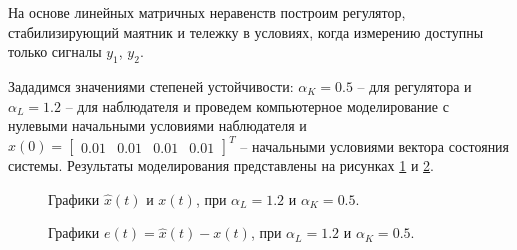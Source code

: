 На основе линейных матричных неравенств построим регулятор, стабилизирующий маятник и тележку в условиях, когда измерению доступны только сигналы $y_1$, $y_2$.

Зададимся значениями степеней устойчивости: $\alpha_K = 0.5$ -- для регулятора и $\alpha_L=1.2$ -- для наблюдателя и проведем компьютерное моделирование с нулевыми начальными условиями наблюдателя и $x(0) = \begin{bmatrix}
    0.01 & 0.01 & 0.01 & 0.01
\end{bmatrix}^T$ -- начальными условиями вектора состояния системы. Результаты моделирования представлены на рисунках \ref{4_6_1.20.5x} и \ref{4_6_1.20.5e}.

\begin{figure}[!h]
	\caption{Графики $\hat{x}(t)$ и $x(t)$, при $\alpha_L = 1.2$ и $\alpha_K = 0.5$.}
	\label{4_6_1.20.5x}
\end{figure}

\begin{figure}[!h]
	\caption{Графики $e(t) = \hat{x}(t)-x(t)$, при $\alpha_L = 1.2$ и $\alpha_K = 0.5$.}
	\label{4_6_1.20.5e}
\end{figure}

